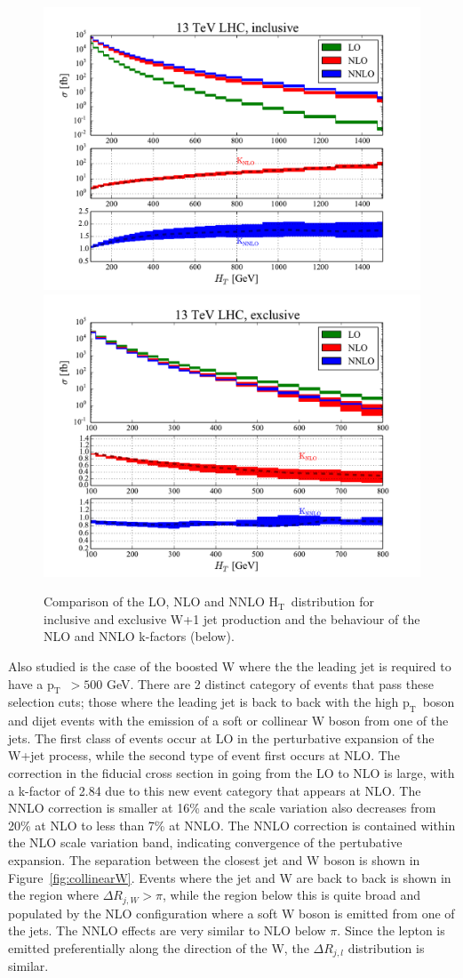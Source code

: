 \documentclass[a4paper,11pt,notoc]{article}
\newcommand{\pt}{\ensuremath{\mathrm{p_T}}}
\newcommand{\Ht}{\ensuremath{\mathrm{H_T}}}
\begin{document}
\begin{figure}[t!]
\centering
\includegraphics[width=0.495\columnwidth]{HT_13TeV_incl.pdf} 
\includegraphics[width=0.495\columnwidth]{HT_13TeV_excl.pdf} 
\caption{Comparison of the LO, NLO and NNLO \Ht\ distribution for inclusive and exclusive W+1 jet production and the behaviour of the NLO and NNLO k-factors (below).}
\label{fig:HT-Wjets}
\end{figure}   
Also studied is the case of the boosted W where the the leading jet is required to have a \pt\ $> 500$ GeV. There are 2 distinct category of events that pass these selection cuts; those where the leading jet is back to back with the high \pt\ boson and dijet events with the emission of a soft or collinear W boson from one of the jets. The first class of events occur at LO in the perturbative expansion of the W+jet process, while the second type of event first occurs at NLO. The correction in the fiducial cross section in going from the LO to NLO is large, with a k-factor of 2.84 due to this new event category that appears at NLO. The NNLO correction is smaller at 16\% and the scale variation also decreases from 20\% at NLO to less than 7\% at NNLO. The NNLO correction is contained within the NLO scale variation band, indicating convergence of the pertubative expansion. 
The separation between the closest jet and W boson is shown in Figure~\ref{fig:collinearW}. Events where the jet and W are back to back is shown in the region where $\Delta R_{j,W} > \pi$, while the region below this is quite broad and populated by the NLO configuration where a soft W boson is emitted from one of the jets. The NNLO effects are very similar to NLO below $\pi$. Since the lepton is emitted preferentially along the direction of the W, the $\Delta R_{j,l}$ distribution is similar. 
\end{document}
